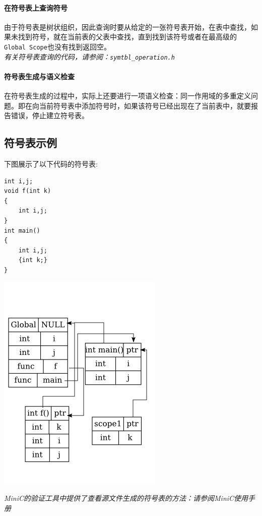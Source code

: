 \paragraph*{在符号表上查询符号}
由于符号表是树状组织，因此查询时要从给定的一张符号表开始，在表中查找，如果未找到符号，就在当前表的父表中查找，直到找到该符号或者在最高级的\verb|Global Scope|也没有找到返回空。
\\
{\it \anchor 有关符号表查询的代码，请参阅：\verb|symtbl_operation.h|}\\
\paragraph*{符号表生成与语义检查}
\label{declchk}
在符号表生成的过程中，实际上还要进行一项语义检查：同一作用域的多重定义问题。即在向当前符号表中添加符号时，如果该符号已经出现在了当前表中，就要报告错误，停止建立符号表。

\subsection{符号表示例}
下图展示了以下代码的符号表:
\begin{lstlisting}
int i,j;
void f(int k)
{
	int i,j;
}
int main()
{
	int i,j;
	{int k;}
}
\end{lstlisting}
\begin{center}
	\includegraphics[scale=0.6]{symtbl.png}
\end{center}
{\it \manerrarrow MiniC的验证工具中提供了查看源文件生成的符号表的方法：请参阅MiniC使用手册}\\
